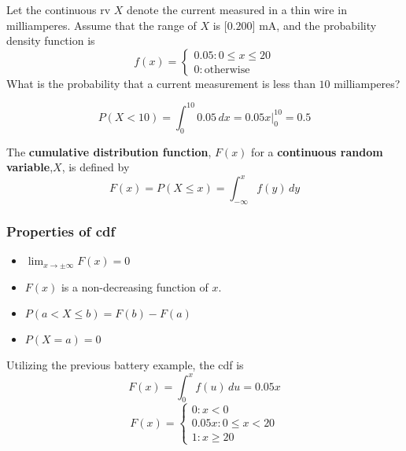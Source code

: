 \documentclass[english, 12pt]{article}
\begin{document}
\begin{exmp}
Let the continuous rv $X$ denote the current measured in a thin wire in milliamperes. Assume that the range of $X$ is $\lbrack 0.200\rbrack$ mA, and the probability density function is
\begin{displaymath}
   f(x) = \left\{
     \begin{array}{lr}
       0.05 : 0 \leq x \leq 20 \\
       0 : \text{otherwise}
     \end{array}
   \right.
\end{displaymath}
What is the probability that a current measurement is less than $10$ milliamperes?

\begin{sol}
\[P (X < 10) = \int_0^{10} 0.05\,dx = 0.05 x\Big|_0^{10} = 0.5\]
\end{sol}
\end{exmp}

\begin{defn}
The \textbf{cumulative distribution function}, $F(x)$ for a \textbf{continuous random variable},$X$, is defined by
\[F(x) = P(X \leq x) = \int_{-\infty}^x f(y)\,dy\]
\end{defn}

\subsubsection*{Properties of cdf}
\begin{itemize}
\item $\lim_{x \to \pm \infty} F(x) = 0$
\item $F(x)$ is a non-decreasing function of $x$.
\item $P(a < X \leq b) = F(b) - F(a)$
\item $P(X = a) = 0$
\end{itemize}

\begin{exmp}
Utilizing the previous battery example, the cdf is
\[F(x) = \int_0^x f(u)\,du = 0.05x\]
\begin{displaymath}
   F(x) = \left\{
     \begin{array}{lr}
       0 : x < 0 \\
       0.05x : 0 \leq x < 20 \\
       1 : x \geq 20
     \end{array}
   \right.
\end{displaymath}
\end{exmp}
\end{document}
